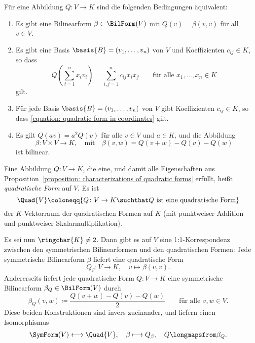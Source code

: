 \begin{proposition}
  \label{proposition: characterizations of quadratic forms}
  Für eine Abbildung $Q \colon V \to K$ sind die folgenden Bedingungen äquivalent:
  \begin{enumerate}
    \item
      Es gibt eine Bilinearform $\beta \in \BilForm(V)$ mit $Q(v) = \beta(v, v)$ für all $v \in V$.
    \item
      Es gibt eine Basis $\basis{B} = (v_1, \dotsc, v_n)$ von $V$ und Koeffizienten $c_{ij} \in K$, so dass
      \begin{equation}
        \label{equation: quadratic form in coordinates}
          Q\left( \sum_{i=1}^n x_i v_i \right)
        = \sum_{i,j=1}^n c_{ij} x_i x_j
        \qquad
        \text{für alle $x_1, \dotsc, x_n \in K$}
      \end{equation}
      gilt.
    \item
      Für jede Basis $\basis{B} = (v_1, \dotsc, v_n)$ von $V$ gibt Koeffizienten $c_{ij} \in K$, so dass \eqref{equation: quadratic form in coordinates} gilt.
    \item
      Es gilt $Q(av) = a^2 Q(v)$ für alle $v \in V$ und $a \in K$, und die Abbildung
      \[
                \beta
        \colon  V \times V
        \to     K,
        \quad\text{mit}\quad
          \beta(v,w)
        = Q(v + w) - Q(v) - Q(w)
      \]
      ist bilinear.
  \end{enumerate}
\end{proposition}

\begin{definition}
  Eine Abbildung $Q \colon V \to K$, die eine, und damit alle Eigenschaften aus Proposition~\ref{proposition: characterizations of quadratic forms} erfüllt, heißt \emph{quadratische Form} auf $V$.
  Es ist
  \[
              \Quad{V}
    \coloneqq \{ Q \colon V \to K \suchthat \text{$Q$ ist eine quadratische Form} \}
  \]
  der $K$-Vektorraum der quadratischen Formen auf $K$ (mit punktweiser Addition und punktweiser Skalarmultiplikation).
\end{definition}

Es sei nun $\ringchar{K} \neq 2$.
Dann gibt es auf $V$ eine 1:1-Korrespondenz zwischen den symmetrischen Bilinearformen und den quadratischen Formen:
Jede symmetrische Bilinearform $\beta$ liefert eine quadratische Form
\[
          Q_\beta
  \colon  V
  \to     K,
  \quad   v
  \mapsto \beta(v,v).
\]
Andererseits liefert jede quadratische Form $Q \colon V \to K$ eine symmetrische Bilinearform $\beta_Q \in \BilForm(V)$ durch
\begin{equation}
  \label{equation: polarisation formula}
            \beta_Q(v,w)
  \coloneqq \frac{Q(v+w) - Q(v) - Q(w)}{2}
  \qquad
  \text{für alle $v, w \in V$}.
\end{equation}
Diese beiden Konstruktionen sind invers zueinander, und liefern einen Isomorphismus
\begin{align*}
                      \SymForm(V)
  \longleftrightarrow \Quad{V},
  \quad
                      \beta
  \longmapsto         Q_\beta,
  \quad
                      Q
  \longmapsfrom       \beta_Q.
\end{align*}

